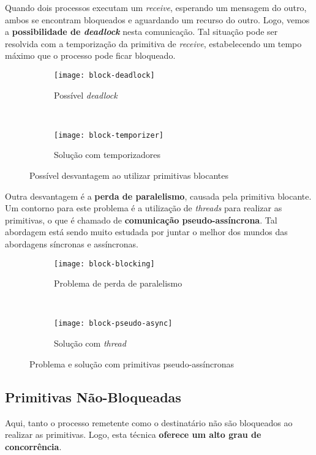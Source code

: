 Quando dois processos executam um \textit{receive}, esperando um mensagem do outro, ambos se encontram bloqueados e aguardando um recurso do outro. Logo, vemos a \textbf{possibilidade de \textit{deadlock}} nesta comunicação. Tal situação pode ser resolvida com a temporização da primitiva de \textit{receive}, estabelecendo um tempo máximo que o processo pode ficar bloqueado.

\begin{figure*}[ht]
  \begin{subfigure}[t]{0.5\textwidth}
    \centering
    \texttt{[image: block-deadlock]}
    \caption{Possível \textit{deadlock}}
    \label{subfig:block-deadlock}
  \end{subfigure}
  ~
  \begin{subfigure}[t]{0.5\textwidth}
    \centering
    \texttt{[image: block-temporizer]}
    \caption{Solução com temporizadores}
    \label{subfig:block-temporizer}
  \end{subfigure}

  \caption{Possível desvantagem ao utilizar primitivas blocantes}
  \label{fig:block-deadlock-scheme}
\end{figure*}

Outra desvantagem é a \textbf{perda de paralelismo}, causada pela primitiva blocante. Um contorno para este problema é a utilização de \textit{threads} para realizar as primitivas, o que é chamado de \textbf{comunicação pseudo-assíncrona}. Tal abordagem está sendo muito estudada por juntar o melhor dos mundos das abordagens síncronas e assíncronas.

\begin{figure*}[ht]
  \begin{subfigure}[t]{0.5\textwidth}
    \centering
    \texttt{[image: block-blocking]}
    \caption{Problema de perda de paralelismo}
    \label{subfig:block-pseudo-async1}
  \end{subfigure}
  ~
  \begin{subfigure}[t]{0.5\textwidth}
    \centering
    \texttt{[image: block-pseudo-async]}
    \caption{Solução com \textit{thread}}
    \label{subfig:block-pseudo-async2}
  \end{subfigure}

  \caption{Problema e solução com primitivas pseudo-assíncronas}
  \label{fig:block-pseudo-async}
\end{figure*}


\subsection{Primitivas Não-Bloqueadas}
Aqui, tanto o processo remetente como o destinatário não são bloqueados ao realizar as primitivas. Logo, esta técnica \textbf{oferece um alto grau de concorrência}.

